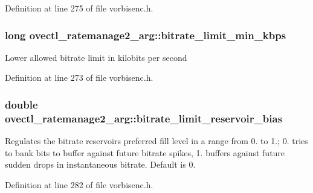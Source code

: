Definition at line 275 of file vorbisenc.\+h.

\subsubsection[{\texorpdfstring{bitrate\+\_\+limit\+\_\+min\+\_\+kbps}{bitrate_limit_min_kbps}}]{\setlength{\rightskip}{0pt plus 5cm}long ovectl\+\_\+ratemanage2\+\_\+arg\+::bitrate\+\_\+limit\+\_\+min\+\_\+kbps}\hypertarget{structovectl__ratemanage2__arg_aeb53a17fff14ec50d143602adfdeabeb}{}\label{structovectl__ratemanage2__arg_aeb53a17fff14ec50d143602adfdeabeb}
Lower allowed bitrate limit in kilobits per second 

Definition at line 273 of file vorbisenc.\+h.

\subsubsection[{\texorpdfstring{bitrate\+\_\+limit\+\_\+reservoir\+\_\+bias}{bitrate_limit_reservoir_bias}}]{\setlength{\rightskip}{0pt plus 5cm}double ovectl\+\_\+ratemanage2\+\_\+arg\+::bitrate\+\_\+limit\+\_\+reservoir\+\_\+bias}\hypertarget{structovectl__ratemanage2__arg_a5567fde1798b1e80e40a77565b4b44f4}{}\label{structovectl__ratemanage2__arg_a5567fde1798b1e80e40a77565b4b44f4}
Regulates the bitrate reservoir\textquotesingle{}s preferred fill level in a range from 0. to 1.; 0. tries to bank bits to buffer against future bitrate spikes, 1. buffers against future sudden drops in instantaneous bitrate. Default is 0. 

Definition at line 282 of file vorbisenc.\+h.


